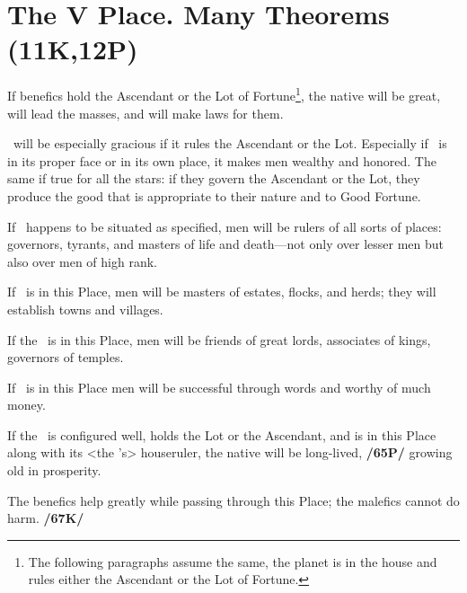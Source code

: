 \section{The V Place. Many Theorems (11K,12P)}
If benefics hold the Ascendant or the Lot of Fortune\footnote{The following paragraphs assume the same, the planet is in the house and rules either the Ascendant or the Lot of Fortune.}, the native will be great, will lead the masses, and will make laws for them.

\Venus\, will be especially gracious if it rules the Ascendant or the Lot. Especially if \Venus\, is in its proper face or in its own place, it makes men wealthy and honored. \mndl The same if true for all the stars: if they govern the Ascendant or the Lot, they produce the good that is appropriate to their nature and to Good Fortune. 

If \Mars\, happens to be situated as specified, men will be rulers of all sorts of places: governors, tyrants, and masters of life and death—not only over lesser men but also over men of
high rank. 

If \Saturn\, is in this Place, men will be masters of estates, flocks, and herds; they will establish towns and villages. 

If the \Sun\, is in this Place, men will be friends of great lords, associates of kings, governors of temples. 

If \Mercury\, is in this Place men will be successful through words and worthy of much money. 

If the \Moon\, is configured well, holds the Lot or the Ascendant, and is in this Place along with its <the \Moon’s> houseruler, the native will be long-lived, \textbf{/65P/} growing old in prosperity. 

\mndl The benefics help greatly while passing through this Place; the malefics cannot do harm. \textbf{/67K/}

\newpage